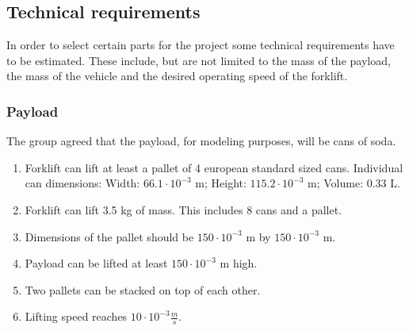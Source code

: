 \documentclass[../report.tex]{subfiles}
\begin{document}
    \subsection{Technical requirements}
        In order to select certain parts for the project some technical requirements 
        have to be estimated. These include, but are not limited to the mass of the 
        payload, the mass of the vehicle and the desired operating speed of the 
        forklift.

        \subsubsection{Payload} %
           The group agreed that the payload, for modeling purposes, will be cans of soda.
           \begin{center}
                \begin{enumerate}
                    \item Forklift can lift at least a pallet of 4 european standard sized cans. Individual can dimensions: Width: $66.1 \cdot 10^{-3}$ m; Height: $115.2 \cdot 10^{-3}$ m; Volume: 0.33 L. %
                    \item Forklift can lift  3.5 kg of mass. This includes 8 cans and a pallet. %
                    \item Dimensions of the pallet should be $150 \cdot 10^{-3}$ m by $150 \cdot 10^{-3}$ m. %
                    \item Payload can be lifted at least $150 \cdot 10^{-3}$ m high. %
                    \item Two pallets can be stacked on top of each other.
                    \item Lifting speed reaches $10 \cdot 10^{-3} \frac{m}{s}$. %
                \end{enumerate}
            \end{center}
\end{document}
